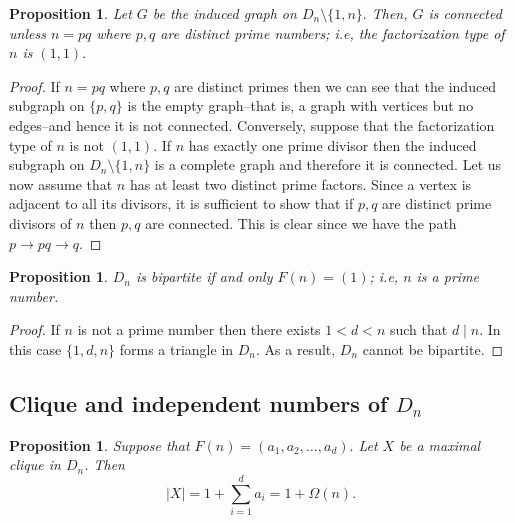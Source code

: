 \documentclass[11pt,a4paper]{amsart}
\newtheorem{prop}[thm]{Proposition}
\theoremstyle{definition}
\numberwithin{equation}{section}
\begin{document}
\begin{prop}
    Let $G$ be the induced graph on $D_n \setminus \{1, n \}.$ Then, $G$ is connected unless $n=pq$ where $p,q$ are distinct prime numbers; i.e, the factorization type of $n$ is $(1,1).$ 
\end{prop}

\begin{proof}
    If $n=pq$ where $p,q$ are distinct primes then we can see that the induced subgraph on $\{p,q \}$ is the empty graph--that is, a graph with vertices but no edges--and hence it is not connected. Conversely, suppose that the factorization type of $n$ is not $(1,1).$ If $n$ has exactly one prime divisor then the induced subgraph on $D_{n} \setminus \{1, n \}$ is a complete graph and therefore it is connected. Let us now assume that $n$ has at least two distinct prime factors. Since a vertex is adjacent to all its divisors, it is sufficient to show that if $p,q$ are distinct prime divisors of $n$ then $p,q$ are connected. This is clear since we have the path $p \to pq \to q.$
\end{proof}

\begin{prop}
 $D_n$ is bipartite if and only $F(n)=(1)$; i.e, $n$ is a prime number. 
\end{prop}
\begin{proof}
If $n$ is not a prime number then there exists $1<d<n$ such that $d \mid n.$ In this case $\{1, d, n \}$ forms a triangle in $D_n.$ As a result, $D_n$ cannot be bipartite. 
\end{proof}


\subsection{Clique and independent numbers of $D_n$}

\begin{prop}
    Suppose that $F(n)=(a_1, a_2, \ldots, a_d).$ Let $X$ be a maximal clique in $D_n$. Then
    \[ |X| = 1+ \sum_{i=1}^d a_i = 1+\Omega(n). \] 
    \end{prop}
\end{document}
